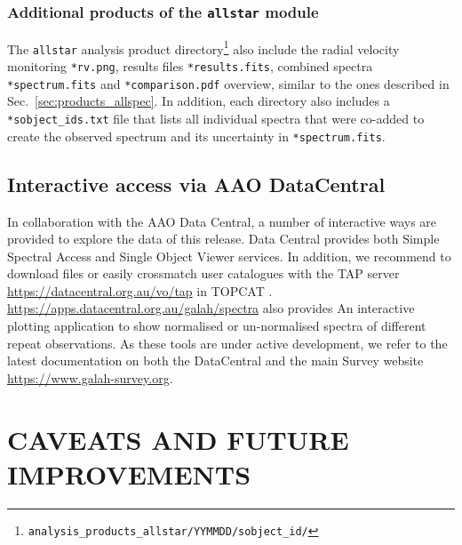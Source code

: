 \documentclass[
  journal=pasa,
  manuscript=research-paper, %
  year=2024,
  volume=37
]{cup-journal}
\begin{document}
\subsubsection{Additional products of the \texttt{allstar} module} \label{sec:products_allstar}

The \texttt{allstar} analysis product directory\footnote{\texttt{analysis\_products\_allstar/YYMMDD/sobject\_id/}} also include the radial velocity monitoring \texttt{*rv.png}, results files  \texttt{*results.fits}, combined spectra \texttt{*spectrum.fits} and \texttt{*comparison.pdf} overview, similar to the ones described in Sec.~\ref{sec:products_allspec}. In addition, each directory also includes a \texttt{*sobject\_ids.txt} file that lists all individual spectra that were co-added to create the observed spectrum and its uncertainty in \texttt{*spectrum.fits}.


\subsection{Interactive access via AAO DataCentral}
\label{sec:interactive}

In collaboration with the AAO Data Central, a number of interactive ways are provided to explore the data of this release. Data Central provides both Simple Spectral Access and Single Object Viewer services. In addition, we recommend to download files or easily crossmatch user catalogues with the TAP server \url{https://datacentral.org.au/vo/tap} in TOPCAT \citep{Taylor2005}. \url{https://apps.datacentral.org.au/galah/spectra} also provides An interactive plotting application to show normalised or un-normalised spectra of different repeat observations. As these tools are under active development, we refer to the latest documentation on both the DataCentral and the main Survey website \url{https://www.galah-survey.org}.

\section{CAVEATS AND FUTURE IMPROVEMENTS} \label{sec:caveats}
\end{document}
